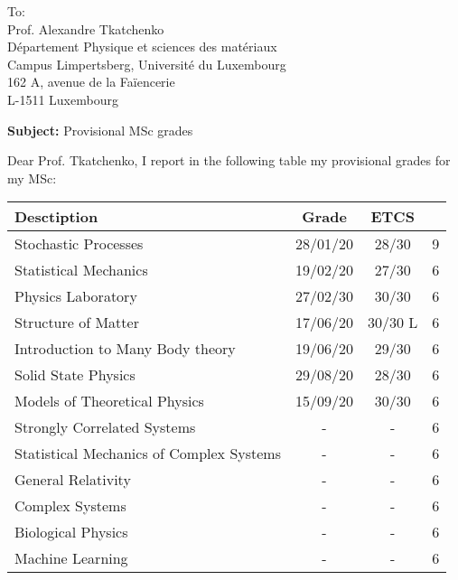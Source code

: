 \documentclass[a4paper]{article} %
\date{14 luglio 2017}
\begin{document}

\begin{letter}{To:\\Prof. Alexandre Tkatchenko\\Département Physique et sciences des matériaux\\Campus Limpertsberg, Université du Luxembourg\\
162 A, avenue de la Faïencerie\\ 
L-1511 Luxembourg} %


\opening{\textbf{Subject:} Provisional MSc grades}
Dear Prof. Tkatchenko,
I report in the following table my provisional grades for my MSc:

\begin{table}
\centering
    \begin{tabular}{lccc}
    \toprule
        \textbf{Desctiption}  &  \textbf{Grade} & \textbf{ETCS} \\
    \midrule
        Stochastic Processes	&	28/01/20	&	28/30	&	9	\\
Statistical Mechanics	&	19/02/20	&	27/30	&	6	\\
Physics Laboratory	&	27/02/30	&	30/30	&	6	\\
Structure of Matter	&	17/06/20	&	30/30 L	&	6	\\
Introduction to Many Body theory	&	19/06/20	&	29/30	&	6	\\
Solid State Physics	&	29/08/20	&	28/30	&	6	\\
Models of Theoretical Physics	&	15/09/20	&	30/30	&	6	\\
Strongly Correlated Systems	&	-	&	-	&	6	\\
Statistical Mechanics of Complex Systems	&	-	&	-	&	6	\\
General Relativity	&	-	&	-	&	6	\\
Complex Systems	&	-	&	-	&	6	\\
Biological Physics	&	-	&	-	&	6	\\
Machine Learning	&	-	&	-	&	6	\\
    \bottomrule
    \end{tabular}
\end{table}







\end{letter}
 
\end{document}

